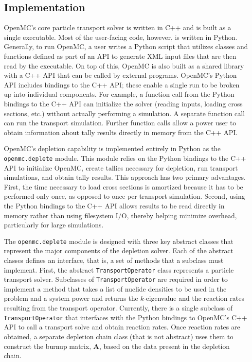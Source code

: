 \documentclass[3p,authoryear]{elsarticle}
\newcommand{\vect}[1]{\mathbf{#1}} %
\begin{document}
\subsection{Implementation}

OpenMC's core particle transport solver is written in C++ and is built as a
single executable. Most of the user-facing code, however, is written in Python.
Generally, to run OpenMC, a user writes a Python script that utilizes classes
and functions defined as part of an API to generate XML input files that are
then read by the executable. On top of this, OpenMC is also built as a shared
library with a C++ API that can be called by external programs. OpenMC's Python
API includes bindings to the C++ API; these enable a single run to be broken up
into individual components. For example, a function call from the Python
bindings to the C++ API can initialize the solver (reading inputs, loading cross
sections, etc.) without actually performing a simulation. A separate function
call can run the transport simulation. Further function calls allow a power user
to obtain information about tally results directly in memory from the C++ API.

OpenMC's depletion capability is implemented entirely in Python as the
\texttt{openmc.deplete} module. This module relies on the Python bindings to the
C++ API to initialize OpenMC, create tallies necessary for depletion, run
transport simulations, and obtain tally results. This approach has two primary
advantages. First, the time necessary to load cross sections is amortized
because it has to be performed only once, as opposed to once per transport
simulation. Second, using the Python bindings to the C++ API allows results to
be read directly in memory rather than using filesystem I/O, thereby helping
minimize overhead, particularly for large simulations.

The \texttt{openmc.deplete} module is designed with three key abstract classes
that represent the major components of the depletion solver. Each of the
abstract classes defines an interface, that is, a set of methods that a subclass
must implement. First, the abstract \texttt{TransportOperator} class represents
a particle transport solver. Subclasses of \texttt{TransportOperator} are
required in order to implement a method that takes a list of nuclide densities
to be used in the problem and a system power and returns the $k$-eigenvalue and
the reaction rates resulting from the transport operator. Currently, there is a
single subclass of \texttt{TransportOperator} that interfaces with the Python
bindings to OpenMC's C++ API to call a transport solve and obtain reaction
rates. Once reaction rates are obtained, a separate depletion chain class (that
is not abstract) uses them to construct the burnup matrix, $\vect{A}$, based on
the data present in the depletion chain.
\end{document}
